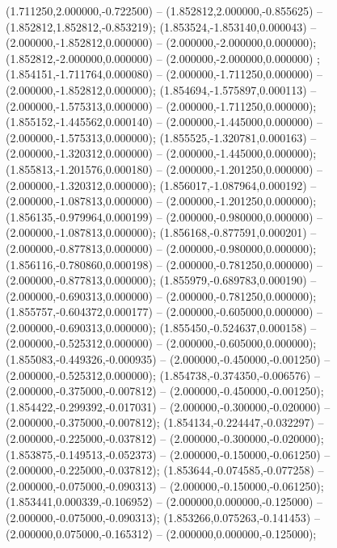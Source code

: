  (1.711250,2.000000,-0.722500) -- (1.852812,2.000000,-0.855625) -- (1.852812,1.852812,-0.853219);
 (1.853524,-1.853140,0.000043) -- (2.000000,-1.852812,0.000000) -- (2.000000,-2.000000,0.000000);
 (1.852812,-2.000000,0.000000) -- (2.000000,-2.000000,0.000000) ;
 (1.854151,-1.711764,0.000080) -- (2.000000,-1.711250,0.000000) -- (2.000000,-1.852812,0.000000);
 (1.854694,-1.575897,0.000113) -- (2.000000,-1.575313,0.000000) -- (2.000000,-1.711250,0.000000);
 (1.855152,-1.445562,0.000140) -- (2.000000,-1.445000,0.000000) -- (2.000000,-1.575313,0.000000);
 (1.855525,-1.320781,0.000163) -- (2.000000,-1.320312,0.000000) -- (2.000000,-1.445000,0.000000);
 (1.855813,-1.201576,0.000180) -- (2.000000,-1.201250,0.000000) -- (2.000000,-1.320312,0.000000);
 (1.856017,-1.087964,0.000192) -- (2.000000,-1.087813,0.000000) -- (2.000000,-1.201250,0.000000);
 (1.856135,-0.979964,0.000199) -- (2.000000,-0.980000,0.000000) -- (2.000000,-1.087813,0.000000);
 (1.856168,-0.877591,0.000201) -- (2.000000,-0.877813,0.000000) -- (2.000000,-0.980000,0.000000);
 (1.856116,-0.780860,0.000198) -- (2.000000,-0.781250,0.000000) -- (2.000000,-0.877813,0.000000);
 (1.855979,-0.689783,0.000190) -- (2.000000,-0.690313,0.000000) -- (2.000000,-0.781250,0.000000);
 (1.855757,-0.604372,0.000177) -- (2.000000,-0.605000,0.000000) -- (2.000000,-0.690313,0.000000);
 (1.855450,-0.524637,0.000158) -- (2.000000,-0.525312,0.000000) -- (2.000000,-0.605000,0.000000);
 (1.855083,-0.449326,-0.000935) -- (2.000000,-0.450000,-0.001250) -- (2.000000,-0.525312,0.000000);
 (1.854738,-0.374350,-0.006576) -- (2.000000,-0.375000,-0.007812) -- (2.000000,-0.450000,-0.001250);
 (1.854422,-0.299392,-0.017031) -- (2.000000,-0.300000,-0.020000) -- (2.000000,-0.375000,-0.007812);
 (1.854134,-0.224447,-0.032297) -- (2.000000,-0.225000,-0.037812) -- (2.000000,-0.300000,-0.020000);
 (1.853875,-0.149513,-0.052373) -- (2.000000,-0.150000,-0.061250) -- (2.000000,-0.225000,-0.037812);
 (1.853644,-0.074585,-0.077258) -- (2.000000,-0.075000,-0.090313) -- (2.000000,-0.150000,-0.061250);
 (1.853441,0.000339,-0.106952) -- (2.000000,0.000000,-0.125000) -- (2.000000,-0.075000,-0.090313);
 (1.853266,0.075263,-0.141453) -- (2.000000,0.075000,-0.165312) -- (2.000000,0.000000,-0.125000);
